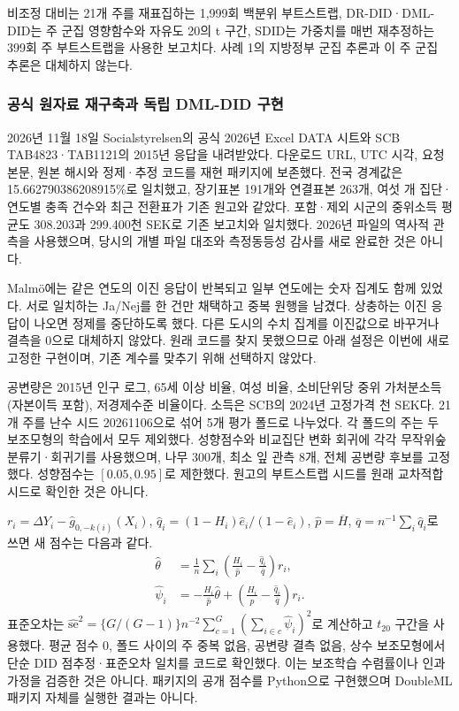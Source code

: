 \documentclass[11pt,a4paper]{article}
\begin{document}
비조정 대비는 21개 주를 재표집하는 1,999회 백분위 부트스트랩, DR-DID·DML-DID는 주 군집 영향함수와 자유도 20의 t 구간, SDID는 가중치를 매번 재추정하는 399회 주 부트스트랩을 사용한 보고치다. 사례 1의 지방정부 군집 추론과 이 주 군집 추론은 대체하지 않는다.


\subsubsection{공식 원자료 재구축과 독립 DML-DID 구현}
2026년 11월 18일 Socialstyrelsen의 공식 2026년 Excel DATA 시트와 SCB TAB4823·TAB1121의 2015년 응답을 내려받았다. 다운로드 URL, UTC 시각, 요청 본문, 원본 해시와 정제·추정 코드를 재현 패키지에 보존했다\cite{newraw,scbcase2}. 전국 경계값은 15.662790386208915\%로 일치했고, 장기표본 191개와 연결표본 263개, 여섯 개 집단·연도별 충족 건수와 최근 전환표가 기존 원고와 같았다. 포함·제외 시군의 중위소득 평균도 308.203과 299.400천 SEK로 기존 보고치와 일치했다. 2026년 파일의 역사적 관측을 사용했으며, 당시의 개별 파일 대조와 측정동등성 감사를 새로 완료한 것은 아니다.

Malmö에는 같은 연도의 이진 응답이 반복되고 일부 연도에는 숫자 집계도 함께 있었다. 서로 일치하는 Ja/Nej를 한 건만 채택하고 중복 원행을 남겼다. 상충하는 이진 응답이 나오면 정제를 중단하도록 했다. 다른 도시의 수치 집계를 이진값으로 바꾸거나 결측을 0으로 대체하지 않았다. 원래 코드를 찾지 못했으므로 아래 설정은 이번에 새로 고정한 구현이며, 기존 계수를 맞추기 위해 선택하지 않았다.

공변량은 2015년 인구 로그, 65세 이상 비율, 여성 비율, 소비단위당 중위 가처분소득(자본이득 포함), 저경제수준 비율이다. 소득은 SCB의 2024년 고정가격 천 SEK다. 21개 주를 난수 시드 20261106으로 섞어 5개 평가 폴드로 나누었다. 각 폴드의 주는 두 보조모형의 학습에서 모두 제외했다. 성향점수와 비교집단 변화 회귀에 각각 무작위숲 분류기·회귀기를 사용했으며, 나무 300개, 최소 잎 관측 8개, 전체 공변량 후보를 고정했다. 성향점수는 $[0.05,0.95]$로 제한했다. 원고의 부트스트랩 시드를 원래 교차적합 시드로 확인한 것은 아니다.

$r_i=\Delta Y_i-\widehat g_{0,-k(i)}(X_i)$, $\widehat q_i=(1-H_i)\widehat e_i/(1-\widehat e_i)$, $\widehat p=\overline H$, $\overline q=n^{-1}\sum_i\widehat q_i$로 쓰면 새 점수는 다음과 같다\cite{dmlscore}.
\begin{align}
\widehat\theta&=\frac1n\sum_i\left(\frac{H_i}{\widehat p}-\frac{\widehat q_i}{\overline q}\right)r_i,\\
\widehat\psi_i&=-\frac{H_i}{\widehat p}\widehat\theta+\left(\frac{H_i}{\widehat p}-\frac{\widehat q_i}{\overline q}\right)r_i.
\end{align}
표준오차는 $\widehat{\mathrm{se}}^2=\{G/(G-1)\}n^{-2}\sum_{c=1}^{G}(\sum_{i\in c}\widehat\psi_i)^2$로 계산하고 $t_{20}$ 구간을 사용했다. 평균 점수 0, 폴드 사이의 주 중복 없음, 공변량 결측 없음, 상수 보조모형에서 단순 DID 점추정·표준오차 일치를 코드로 확인했다. 이는 보조학습 수렴률이나 인과 가정을 검증한 것은 아니다. 패키지의 공개 점수를 Python으로 구현했으며 DoubleML 패키지 자체를 실행한 결과는 아니다.
\end{document}

